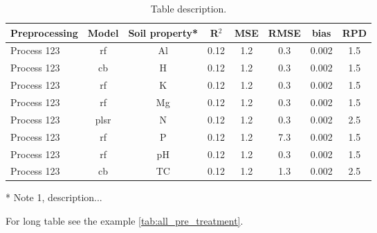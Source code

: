 \documentclass[a4paper,12pt,twoside]{article}
\begin{document}
\begin{table}[h]
	\renewcommand{\tabcolsep}{2.6pt} %
	\centering
	\caption{Table description.}
	\label{tab:test2}
	\vspace{0cm}
	\begin{tabular}{ l c c c c c c c }
		\toprule
		Preprocessing     & Model & Soil property* & R$^2$ & MSE & RMSE & bias & RPD \\ 
		\midrule
		Process 123       & rf   & Al & 0.12 & 1.2 & 0.3 & 0.002 & 1.5 \\
		Process 123       & cb   & H  & 0.12 & 1.2 & 0.3 & 0.002 & 1.5 \\
		Process 123       & rf   & K  & 0.12 & 1.2 & 0.3 & 0.002 & 1.5 \\
		Process 123       & rf   & Mg & 0.12 & 1.2 & 0.3 & 0.002 & 1.5 \\
		Process 123       & plsr & N  & 0.12 & 1.2 & 0.3 & 0.002 & 2.5 \\
		Process 123       & rf   & P  & 0.12 & 1.2 & 7.3 & 0.002 & 1.5 \\
		Process 123       & rf   & pH & 0.12 & 1.2 & 0.3 & 0.002 & 1.5 \\
		Process 123       & cb   & TC & 0.12 & 1.2 & 1.3 & 0.002 & 2.5 \\
		\bottomrule
	\end{tabular}
	\begin{tablenotes}
	\footnotesize
	\item[*] Note 1, description...
	\end{tablenotes}
\end{table}


For long table see the example \ref{tab:all_pre_treatment}.
\end{document}
